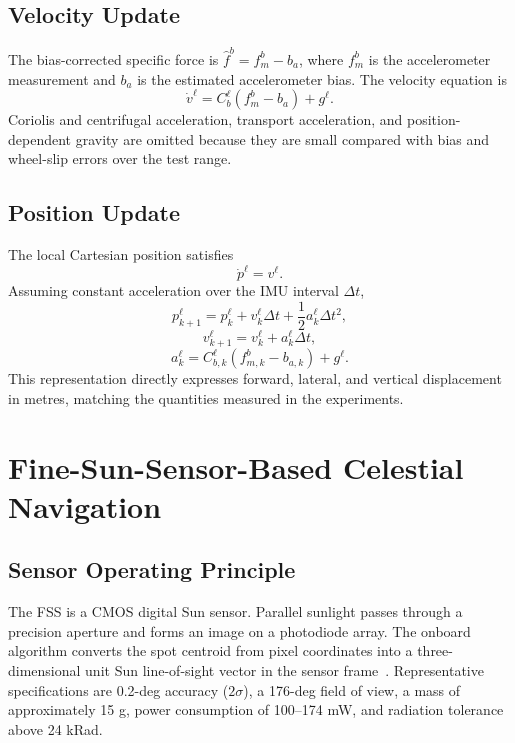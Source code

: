 \documentclass[]{IAC_style}
\begin{document}
\subsection{Velocity Update}

The bias-corrected specific force is $\hat f^b=f_m^b-b_a$, where $f_m^b$ is the accelerometer measurement and $b_a$ is the estimated accelerometer bias. The velocity equation is
\begin{equation}
\tag{4}\label{eq:4}
\dot v^\ell=C_b^\ell\left(f_m^b-b_a\right)+g^\ell.
\end{equation}
Coriolis and centrifugal acceleration, transport acceleration, and position-dependent gravity are omitted because they are small compared with bias and wheel-slip errors over the test range.

\subsection{Position Update}

The local Cartesian position satisfies
\begin{equation}
\tag{5}\label{eq:5}
\dot p^\ell=v^\ell.
\end{equation}
Assuming constant acceleration over the IMU interval $\Delta t$,
\begin{equation*}
p_{k+1}^\ell=p_k^\ell+v_k^\ell\Delta t+\frac{1}{2}a_k^\ell\Delta t^2,
\end{equation*}
\begin{equation*}
v_{k+1}^\ell=v_k^\ell+a_k^\ell\Delta t,
\end{equation*}
\begin{equation*}
a_k^\ell=C_{b,k}^\ell(f_{m,k}^b-b_{a,k})+g^\ell.
\end{equation*}
This representation directly expresses forward, lateral, and vertical displacement in metres, matching the quantities measured in the experiments.

\section{Fine-Sun-Sensor-Based Celestial Navigation}

\subsection{Sensor Operating Principle}

The FSS is a CMOS digital Sun sensor. Parallel sunlight passes through a precision aperture and forms an image on a photodiode array. The onboard algorithm converts the spot centroid from pixel coordinates into a three-dimensional unit Sun line-of-sight vector in the sensor frame~\cite{rhee2007satellite}. Representative specifications are 0.2-deg accuracy ($2\sigma$), a 176-deg field of view, a mass of approximately 15 g, power consumption of 100--174 mW, and radiation tolerance above 24 kRad.
\end{document}
